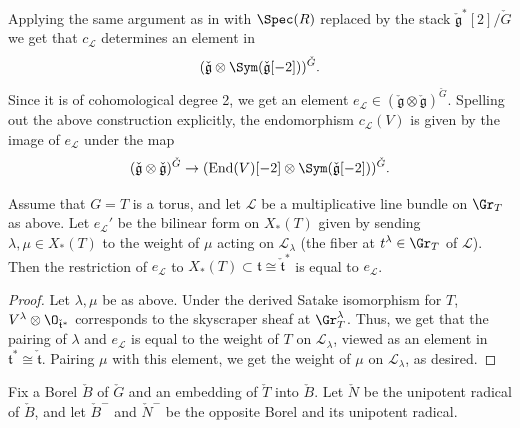 \documentclass[11pt]{article}
\begin{document}
\begin{appendices}
Applying the same argument as in \cite[Remark 5.4]{YZ} with $\Spec(R)$ replaced by the stack $\check{\mathfrak{g}}^*[2] / \check{G}$ we get that $c_\mathcal{L}$ determines an element in $$(\check{\mathfrak{g}}\otimes \Sym(\check{\mathfrak{g}}[-2]))^{\check{G}}.$$
Since it is of cohomological degree 2, we get an element $e_\mathcal{L}\in (\check{\mathfrak{g}}\otimes \check{\mathfrak{g}})^{\check{G}}$.
Spelling out the above construction explicitly, the endomorphism $c_\mathcal{L}(V)$ is given by the image of $e_\mathcal{L}$ under the map $$(\check{\mathfrak{g}}\otimes \check{\mathfrak{g}})^{\check{G}}\to (\mathrm{End}(V)[-2]\otimes \Sym(\check{\mathfrak{g}}[-2]))^{\check{G}}.$$

\begin{lemma}\label{lemma: line bundle to bilinear form for torus}
    Assume that $G=T$ is a torus, and let $\mathcal{L}$ be a multiplicative line bundle on $\Gr_T$ as above.
    Let $e_\mathcal{L}'$ be the bilinear form on $X_*(T)$ given by sending $\lambda,\mu\in X_*(T)$ to the weight of $\mu$ acting on $\mathcal{L}_\lambda$ (the fiber at $t^\lambda\in \Gr_T$ of $\mathcal{L}$). Then the restriction of $e_\mathcal{L}$ to $X_*(T)\subset \mathfrak{t}\cong \check{\mathfrak{t}}^*$ is equal to $e_\mathcal{L}$.
\end{lemma}
\begin{proof}
    Let $\lambda, \mu$ be as above. Under the derived Satake isomorphism for $T$, $V^\lambda\otimes \O_{\check{\mathfrak{t}}^*}$ corresponds to the skyscraper sheaf at $\Gr_T^\lambda$. Thus, we get that the pairing of $\lambda$ and $e_\mathcal{L}$ is equal to the weight of $T$ on $\mathcal{L}_\lambda$, viewed as an element in $\mathfrak{t}^*\cong \check{\mathfrak{t}}$. Pairing $\mu$ with this element, we get the weight of $\mu$ on $\mathcal{L}_\lambda$, as desired.
\end{proof}

Fix a Borel $\check{B}$ of $\check{G}$ and an embedding of $\check{T}$ into $\check{B}$. Let $\check{N}$ be the unipotent radical of $\check{B}$, and let $\check{B}^-$ and $\check{N}^-$ be the opposite Borel and its unipotent radical.


\end{appendices}
\end{document}
